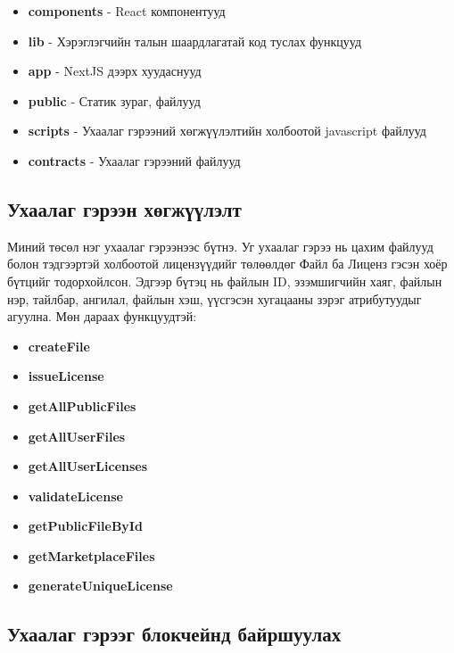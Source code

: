 \begin{itemize}
	\item \textbf{components} - React компонентууд
	\item \textbf{lib} - Хэрэглэгчийн талын шаардлагатай код туслах функцууд
	\item \textbf{app} - NextJS дээрх хуудаснууд
	\item \textbf{public} - Статик зураг, файлууд
	\item \textbf{scripts} - Ухаалаг гэрээний хөгжүүлэлтийн холбоотой  javascript файлууд
	\item \textbf{contracts} - Ухаалаг гэрээний файлууд
\end{itemize}

\subsection{Ухаалаг гэрээн хөгжүүлэлт}
Миний төсөл нэг ухаалаг гэрээнээс бүтнэ.
Уг ухаалаг гэрээ нь цахим файлууд болон тэдгээртэй холбоотой лицензүүдийг төлөөлдөг Файл ба Лиценз гэсэн хоёр бүтцийг тодорхойлсон. Эдгээр бүтэц нь файлын ID, эзэмшигчийн хаяг, файлын нэр, тайлбар, ангилал, файлын хэш, үүсгэсэн хугацааны  зэрэг атрибутуудыг агуулна. Мөн дараах функцуудтэй:

\begin{itemize}
	\item \textbf{createFile}
	\item \textbf{issueLicense}
	\item \textbf{getAllPublicFiles}
	\item \textbf{getAllUserFiles}
	\item \textbf{getAllUserLicenses}
	\item \textbf{validateLicense}
	\item \textbf{getPublicFileById}
	\item \textbf{getMarketplaceFiles}
	\item \textbf{generateUniqueLicense}
\end{itemize}



\subsection{Ухаалаг гэрээг блокчейнд байршуулах}


